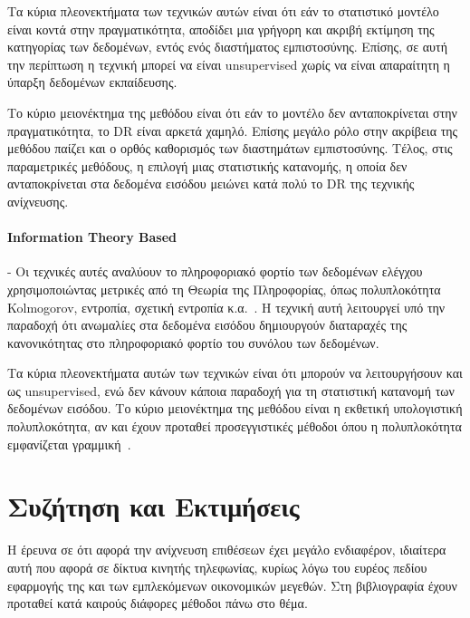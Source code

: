 \documentclass[12pt]{report}
\begin{document}
Τα κύρια πλεονεκτήματα των τεχνικών αυτών είναι ότι εάν το στατιστικό μοντέλο είναι κοντά στην πραγματικότητα, αποδίδει μια γρήγορη και ακριβή εκτίμηση της κατηγορίας των δεδομένων, εντός ενός διαστήματος εμπιστοσύνης. Επίσης, σε αυτή την περίπτωση η τεχνική μπορεί να είναι \textlatin{unsupervised} χωρίς να είναι απαραίτητη η ύπαρξη δεδομένων εκπαίδευσης.

Το κύριο μειονέκτημα της μεθόδου είναι ότι εάν το μοντέλο δεν ανταποκρίνεται στην πραγματικότητα, το \textlatin{DR} είναι αρκετά χαμηλό. Επίσης μεγάλο ρόλο στην ακρίβεια της μεθόδου παίζει και ο ορθός καθορισμός των διαστημάτων εμπιστοσύνης. Τέλος, στις παραμετρικές μεθόδους, η επιλογή μιας στατιστικής κατανομής, η οποία δεν ανταποκρίνεται στα δεδομένα εισόδου μειώνει κατά πολύ το \textlatin{DR} της τεχνικής ανίχνευσης.

\paragraph{\textlatin{Information Theory Based}} - Οι τεχνικές αυτές αναλύουν το πληροφοριακό φορτίο των δεδομένων ελέγχου χρησιμοποιώντας μετρικές από τη Θεωρία της Πληροφορίας, όπως πολυπλοκότητα \textlatin{Kolmogorov}, εντροπία, σχετική εντροπία κ.α.~\cite{paper:14}. Η τεχνική αυτή λειτουργεί υπό την παραδοχή ότι ανωμαλίες στα δεδομένα εισόδου δημιουργούν διαταραχές της κανονικότητας στο πληροφοριακό φορτίο του συνόλου των δεδομένων.

Τα κύρια πλεονεκτήματα αυτών των τεχνικών είναι ότι μπορούν να λειτουργήσουν και ως \textlatin{unsupervised}, ενώ δεν κάνουν κάποια παραδοχή για τη στατιστική κατανομή των δεδομένων εισόδου. Το κύριο μειονέκτημα της μεθόδου είναι η εκθετική υπολογιστική πολυπλοκότητα, αν και έχουν προταθεί προσεγγιστικές μέθοδοι όπου η πολυπλοκότητα εμφανίζεται γραμμική~\cite{paper:14}.

\section{Συζήτηση και Εκτιμήσεις}
Η έρευνα σε ότι αφορά την ανίχνευση επιθέσεων έχει μεγάλο ενδιαφέρον, ιδιαίτερα αυτή που αφορά σε δίκτυα κινητής τηλεφωνίας, κυρίως λόγω του ευρέος πεδίου εφαρμογής της και των εμπλεκόμενων οικονομικών μεγεθών. Στη βιβλιογραφία έχουν προταθεί κατά καιρούς διάφορες μέθοδοι πάνω στο θέμα.
\end{document}
